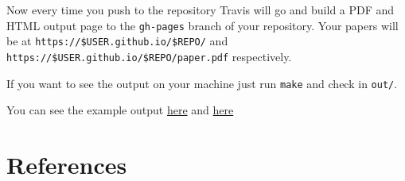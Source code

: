 \documentclass[]{templates/sig-alternate-2}
\begin{document}
Now every time you push to the repository Travis will go and build a PDF and HTML output page to the \texttt{gh-pages} branch of your repository. Your papers will be at \texttt{https://\$USER.github.io/\$REPO/} and \texttt{https://\$USER.github.io/\$REPO/paper.pdf} respectively.

If you want to see the output on your machine just run \texttt{make} and check in \texttt{out/}.

You can see the example output \href{https://hoverbear.github.io/acm-pandoc-paper/}{here} and \href{https://hoverbear.github.io/acm-pandoc-paper/paper.pdf}{here}

\section{References}\label{references}
\end{document}
